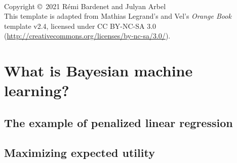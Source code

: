 \documentclass[11pt,fleqn]{book} %
\begin{document}



\newpage
~\vfill
\thispagestyle{empty}

\noindent Copyright \copyright\ 2021 Rémi Bardenet and Julyan Arbel\\ %


\noindent This template is adapted from Mathias Legrand's and Vel's
 \emph{Orange Book} template v2.4, licensed under CC BY-NC-SA 3.0
 (\url{http://creativecommons.org/licenses/by-nc-sa/3.0/}).



\pagestyle{empty} %
\tableofcontents %
\cleardoublepage %
\pagestyle{fancy} %

\part{What is Bayesian machine learning?}
    \chapter{The example of penalized linear regression}
    
    \chapter{Maximizing expected utility}
    
\end{document}
